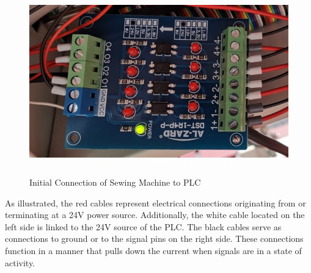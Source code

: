 \begin{figure}[H]
	\includegraphics[height=8cm]{pic/optocoupler-wiring.jpg}
	\caption{Initial Connection of Sewing Machine to PLC}
	\label{fig:Model-Component-Pattern}
\end{figure}
As illustrated, the red cables represent electrical connections originating from or terminating at a 24V power source. Additionally, the white cable located on the left side is linked to the 24V source of the PLC. The black cables serve as connections to ground or to the signal pins on the right side. These connections function in a manner that pulls down the current when signals are in a state of activity.


